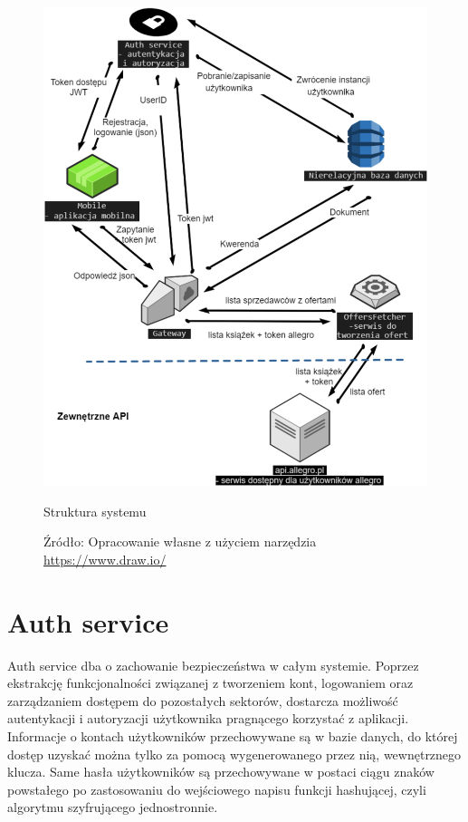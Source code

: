 \begin{figure}[H]
	\centering
	\includegraphics[width=\linewidth]{architecture_overview.pdf}
	\caption{\centering Struktura systemu}
	\caption*{\centering Źródło: {Opracowanie własne z użyciem narzędzia \url{https://www.draw.io/}}}
\end{figure}

\section{Auth service}
Auth service dba o zachowanie bezpieczeństwa w całym systemie.
Poprzez ekstrakcję funkcjonalności związanej z tworzeniem kont, logowaniem oraz zarządzaniem dostępem do pozostałych sektorów, dostarcza możliwość autentykacji i autoryzacji użytkownika pragnącego korzystać z aplikacji.
Informacje o kontach użytkowników przechowywane są w bazie danych, do której dostęp uzyskać można tylko za pomocą wygenerowanego przez nią, wewnętrznego klucza. Same hasła użytkowników są przechowywane w postaci ciągu znaków powstałego po zastosowaniu do wejściowego napisu funkcji hashującej, czyli algorytmu szyfrującego jednostronnie.

